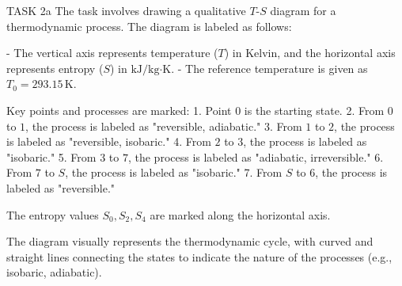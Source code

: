 TASK 2a  
The task involves drawing a qualitative \( T \)-\( S \) diagram for a thermodynamic process. The diagram is labeled as follows:

- The vertical axis represents temperature (\( T \)) in Kelvin, and the horizontal axis represents entropy (\( S \)) in \( \text{kJ}/\text{kg·K} \).  
- The reference temperature is given as \( T_0 = 293.15 \, \text{K} \).  

Key points and processes are marked:  
1. Point \( 0 \) is the starting state.  
2. From \( 0 \) to \( 1 \), the process is labeled as "reversible, adiabatic."  
3. From \( 1 \) to \( 2 \), the process is labeled as "reversible, isobaric."  
4. From \( 2 \) to \( 3 \), the process is labeled as "isobaric."  
5. From \( 3 \) to \( 7 \), the process is labeled as "adiabatic, irreversible."  
6. From \( 7 \) to \( S \), the process is labeled as "isobaric."  
7. From \( S \) to \( 6 \), the process is labeled as "reversible."  

The entropy values \( S_0, S_2, S_4 \) are marked along the horizontal axis.  

The diagram visually represents the thermodynamic cycle, with curved and straight lines connecting the states to indicate the nature of the processes (e.g., isobaric, adiabatic).